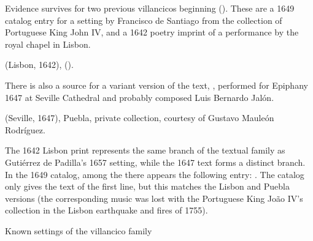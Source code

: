 Evidence survives for two previous villancicos beginning  ().
These are a 1649 catalog entry for a setting by Francisco de Santiago from the
collection of Portuguese King John IV, and a 1642 poetry imprint of a
performance by the royal chapel in Lisbon.%
\begin{Footnote}
     (Lisbon, 1642),
     ().
\end{Footnote}
There is also a source for a variant version of the text, , performed for Epiphany 1647 at Seville Cathedral and probably composed
Luis Bernardo Jalón.%
\begin{Footnote}
     (Seville, 1647), Puebla, private
    collection, courtesy of Gustavo Mauleón Rodríguez.
\end{Footnote}
The 1642 Lisbon print represents the same branch of the textual family as
Gutiérrez de Padilla's 1657 setting, while the 1647  text
forms a distinct branch.
In the 1649 catalog, among the  there appears the following entry:
.%
    \Autocite[caixão 26, ]{JohnIV:Catalog}
The catalog only gives the text of the first line, but this matches the Lisbon
and Puebla versions (the corresponding music was lost with the Portuguese King
João IV's collection in the Lisbon earthquake and fires of 1755).


{Known settings of the  villancico family}


